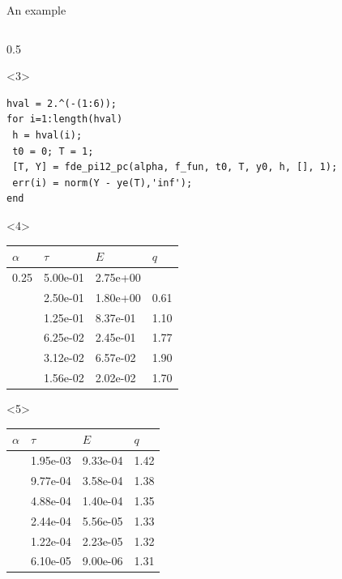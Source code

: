 \documentclass[aspectratio=169,xcolor=dvipsnames]{beamer}
\begin{document}
\begin{frame}[fragile]{An example}
\begin{columns}
\begin{column}{0.5\columnwidth}
\begin{onlyenv}
{}
\end{onlyenv}%
\begin{onlyenv}<3>
\begin{verbatim}
hval = 2.^(-(1:6));
for i=1:length(hval)
 h = hval(i);
 t0 = 0; T = 1;
 [T, Y] = fde_pi12_pc(alpha, f_fun, t0, T, y0, h, [], 1);
 err(i) = norm(Y - ye(T),'inf');
end
\end{verbatim}
\end{onlyenv}
\begin{onlyenv}<4>
\begin{tabular}{llll}
\toprule
$\alpha$ & $\tau$ & $E$ & $q$ \\
\midrule
0.25 & 5.00e-01 & 2.75e+00 & \\
& 2.50e-01 & 1.80e+00 & 0.61 \\
& 1.25e-01 & 8.37e-01 & 1.10 \\
& 6.25e-02 & 2.45e-01 & 1.77 \\
& 3.12e-02 & 6.57e-02 & 1.90 \\
& 1.56e-02 & 2.02e-02 & 1.70 \\
\bottomrule
\end{tabular}
\end{onlyenv}
\begin{onlyenv}<5>
	\begin{tabular}{llll}
		\toprule
		$\alpha$ & $\tau$ & $E$ & $q$ \\
		\midrule
     & 1.95e-03 & 9.33e-04 & 1.42 \\
& 9.77e-04 & 3.58e-04 & 1.38 \\
& 4.88e-04 & 1.40e-04 & 1.35 \\
& 2.44e-04 & 5.56e-05 & 1.33 \\
& 1.22e-04 & 2.23e-05 & 1.32 \\
& 6.10e-05 & 9.00e-06 & 1.31 \\
		\bottomrule
	\end{tabular}
\end{onlyenv}
\end{column}
\end{columns}

\end{frame}
\end{document}
